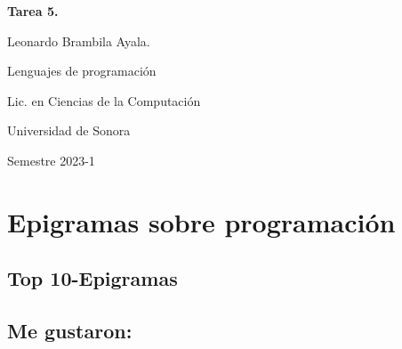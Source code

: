 \documentclass[letterpaper,12pt]{article}
\begin{document}
\begin{center}
  \textbf{Tarea 5.}\par
  \bigskip
  Leonardo Brambila Ayala.\par
  \bigskip
  Lenguajes de programación\par
  Lic. en Ciencias de la Computación\par
  Universidad de Sonora\par
  Semestre 2023-1\par
\end{center}

\section{Epigramas sobre programación}
\subsection {Top 10-Epigramas}

\subsection* {Me gustaron: }
\end{document}

